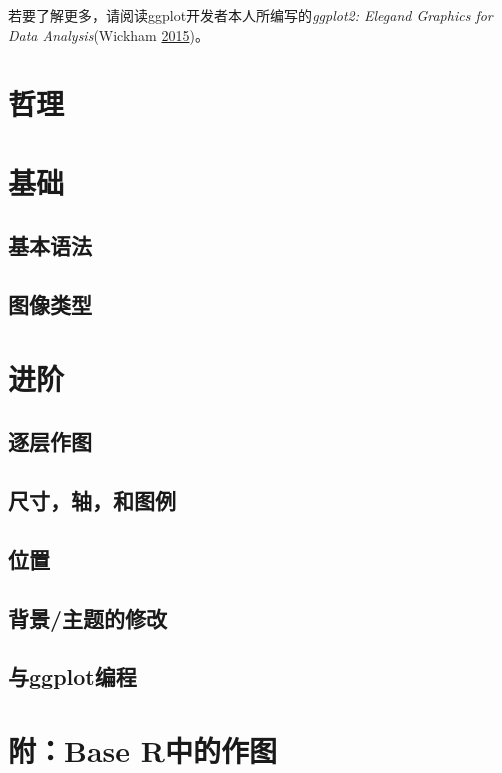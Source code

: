\documentclass[]{book}
\begin{document}
若要了解更多，请阅读ggplot开发者本人所编写的\emph{ggplot2: Elegand Graphics for Data Analysis}(Wickham \protect\hyperlink{ref-Wickham2015ggplot2-Elegant-Gra}{2015})。

\section{哲理}

\section{基础}

\subsection{基本语法}

\subsection{图像类型}

\section{进阶}

\subsection{逐层作图}

\subsection{尺寸，轴，和图例}

\subsection{位置}

\subsection{背景/主题的修改}

\hypertarget{ggplot}{%
\subsection{与ggplot编程}\label{ggplot}}

\hypertarget{base-r}{%
\section{附：Base R中的作图}\label{base-r}}
\end{document}
